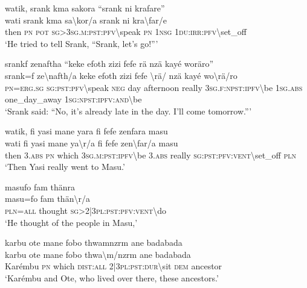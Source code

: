 \ea\label{ex:4:a1683}
watik, srank kma sakora ``srank ni krafare''\\
\gll wati	srank	kma	sa{\textbackslash}kor/a	srank	ni	kra{\textbackslash}far/e\\
     then	\textsc{pn}	\textsc{pot}	\textsc{sg}>3\textsc{sg}.\textsc{m}:\textsc{pst}:\textsc{pfv}{\textbackslash}speak	\textsc{pn}	1\textsc{nsg}	1\textsc{du}:\textsc{irr}:\textsc{pfv}{\textbackslash}set\_off\\
\glt `He tried to tell Srank, ``Srank, let's go!'''
\z

\ea\label{ex:4:a1684}
srankf zenaftha ``keke efoth zizi fefe rä nzä kayé woräro''\\
\gll srank=f	ze{\textbackslash}nafth/a	keke	efoth	zizi	fefe	{\textbackslash}rä/	nzä	kayé	wo{\textbackslash}rä/ro\\
     \textsc{pn}=\textsc{erg}.\textsc{sg}	\textsc{sg}:\textsc{pst}:\textsc{pfv}{\textbackslash}speak	\textsc{neg}	day	afternoon	really	3\textsc{sg}.\textsc{f}:\textsc{npst}:\textsc{ipfv}{\textbackslash}be	1\textsc{sg}.\textsc{abs}	one\_day\_away	1\textsc{sg}:\textsc{npst}:\textsc{ipfv}:\textsc{and}{\textbackslash}be\\
\glt `Srank said: ``No, it's already late in the day. I'll come tomorrow.'''
\z

\ea\label{ex:4:a1685}
watik, fi yasi mane yara fi fefe zenfara masu\\
\gll wati	fi	yasi	mane	ya{\textbackslash}r/a	fi	fefe	zen{\textbackslash}far/a	masu\\
     then	3.\textsc{abs}	\textsc{pn}	which	3\textsc{sg}.\textsc{m}:\textsc{pst}:\textsc{ipfv}{\textbackslash}be	3.\textsc{abs}	really	\textsc{sg}:\textsc{pst}:\textsc{pfv}:\textsc{vent}{\textbackslash}set\_off	\textsc{pln}\\
\glt `Then Yasi really went to Masu.'
\z

\ea\label{ex:4:a1686}
masufo fam thänra\\
\gll masu=fo	fam	thän{\textbackslash}r/a\\
     \textsc{pln}=\textsc{all}	thought	\textsc{sg}>2|3\textsc{pl}:\textsc{pst}:\textsc{pfv}:\textsc{vent}{\textbackslash}do\\
\glt `He thought of the people in Masu,'
\z

\ea\label{ex:4:a1687}
karbu ote mane fobo thwamnzrm ane badabada\\
\gll karbu	ote	mane	fobo	thwa{\textbackslash}m/nzrm	ane	badabada\\
     Karémbu	\textsc{pn}	which	\textsc{dist}:\textsc{all}	2|3\textsc{pl}:\textsc{pst}:\textsc{dur}{\textbackslash}sit	\textsc{dem}	ancestor\\
\glt `Karémbu and Ote, who lived over there, these ancestors.'
\z

